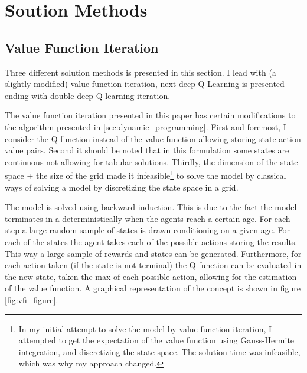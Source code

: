 \section{Soution Methods}\label{sec:solution_methods}

\subsection{Value Function Iteration}

Three different solution methods is presented in this section. I lead with (a slightly modified) value function iteration, next deep Q-Learning is presented ending with double deep Q-learning iteration.

The value function iteration presented in this paper has certain modifications to the algorithm presented in \ref{sec:dynamic_programming}. First and foremost, I consider the Q-function instead of the value function allowing storing state-action value pairs. Second it should be noted that in this formulation some states are continuous not allowing for tabular solutions. Thirdly, the dimension of the state-space + the size of the grid made it infeasible\footnote{In my initial attempt to solve the model by value function iteration, I attempted to get the expectation of the value function using Gauss-Hermite integration, and discretizing the state space. The solution time was infeasible, which was why my approach changed.} to solve the model by classical ways of solving a model by discretizing the state space in a grid. 

The model is solved using backward induction. This is due to the fact the model terminates in a deterministically when the agents reach a certain age. For each step a large random sample of states is drawn conditioning on a given age. For each of the states the agent takes each of the possible actions storing the results. This way a large sample of rewards and states can be generated. Furthermore, for each action taken (if the state is not terminal) the  Q-function can be evaluated in the new state, taken the max of each possible action, allowing for the estimation of the value function. A graphical representation of the concept is shown in figure \ref{fig:vfi_figure}. 

